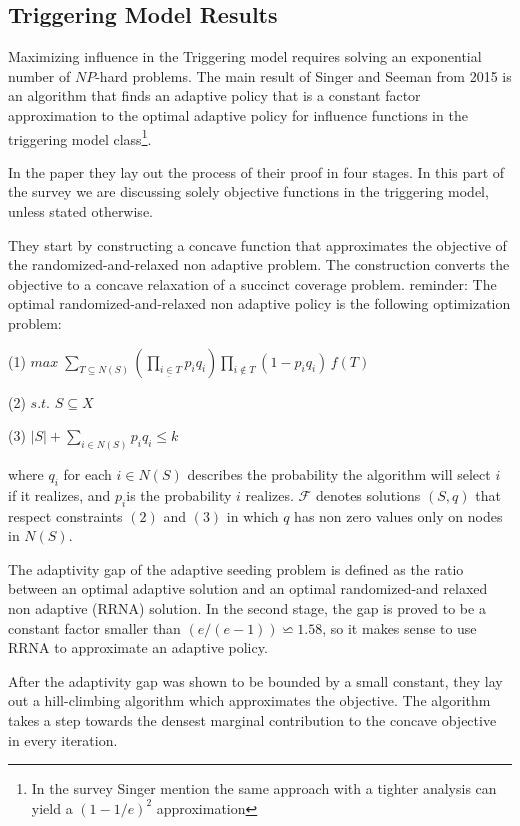 \subsection{Triggering Model Results}

Maximizing influence in the Triggering model requires solving an exponential
number of $NP$-hard problems. The main result of Singer and Seeman
from 2015 is an algorithm that finds an adaptive policy that is a
constant factor approximation to the optimal adaptive policy for influence
functions in the triggering model class\footnote{In the survey Singer mention the same approach with a tighter analysis
can yield a $(1-1/e)^{2}$ approximation}.

In the paper they lay out the process of their proof in four stages.
In this part of the survey we are discussing solely objective functions
in the triggering model, unless stated otherwise. 



They start by constructing a concave function that approximates the
objective of the randomized-and-relaxed non adaptive problem. The
construction converts the objective to a concave relaxation of a succinct
coverage problem. reminder: The optimal randomized-and-relaxed non
adaptive policy is the following optimization problem: 

(1) $max\;\sum_{T\subseteq N(S)}(\prod_{\underbar{i\ensuremath{\in}T}}p_{i}q_{i})\prod_{i\notin T}(1-p_{i}q_{i})\,f(T)$

(2) $s.t.$ $S\subseteq X$

(3) $|S|+\sum_{i\in N(S)}p_{i}q_{i}\leq k$

where $q_{i}$ for each $i\in N(S)$ describes the probability the
algorithm will select $i$ if it realizes, and $p_{i}$is the probability
$i$ realizes. $\mathcal{F}$ denotes solutions $(S,q)$ that respect
constraints $(2)$ and $(3)$ in which $q$ has non zero values only
on nodes in $N(S)$.

The adaptivity gap of the adaptive seeding problem is defined as the
ratio between an optimal adaptive solution and an optimal randomized-and
relaxed non adaptive (RRNA) solution. In the second stage, the gap
is proved to be a constant factor smaller than $(e/(e-1))\backsimeq1.58$,
so it makes sense to use RRNA to approximate an adaptive policy.

After the adaptivity gap was shown to be bounded by a small constant,
they lay out a hill-climbing algorithm which approximates the objective.
The algorithm takes a step towards the densest marginal contribution
to the concave objective in every iteration.

